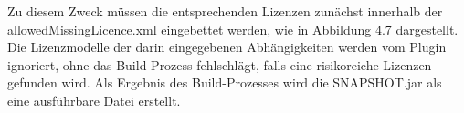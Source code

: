 Zu diesem Zweck müssen die entsprechenden Lizenzen zunächst innerhalb der allowedMissingLicence.xml eingebettet werden, wie in Abbildung 4.7 dargestellt. Die Lizenzmodelle der darin eingegebenen Abhängigkeiten werden vom Plugin ignoriert, ohne das Build-Prozess fehlschlägt, falls eine risikoreiche Lizenzen gefunden wird. Als Ergebnis des Build-Prozesses wird die SNAPSHOT.jar als eine ausführbare Datei erstellt. 

















